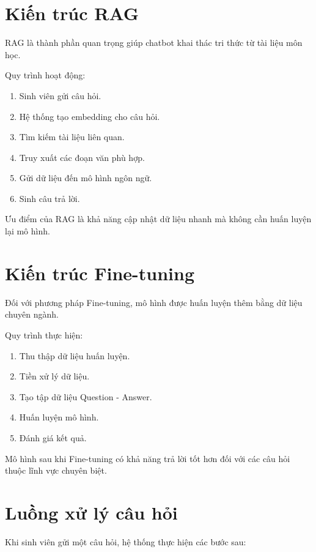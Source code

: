 \documentclass[12pt,a4paper]{report}
\begin{document}
	\section{Kiến trúc RAG}
	
	RAG là thành phần quan trọng giúp chatbot khai thác tri thức từ tài liệu môn học.
	
	Quy trình hoạt động:
	
	\begin{enumerate}
		\item Sinh viên gửi câu hỏi.
		\item Hệ thống tạo embedding cho câu hỏi.
		\item Tìm kiếm tài liệu liên quan.
		\item Truy xuất các đoạn văn phù hợp.
		\item Gửi dữ liệu đến mô hình ngôn ngữ.
		\item Sinh câu trả lời.
	\end{enumerate}
	
	Ưu điểm của RAG là khả năng cập nhật dữ liệu nhanh mà không cần huấn luyện lại mô hình.
	
	\section{Kiến trúc Fine-tuning}
	
	Đối với phương pháp Fine-tuning, mô hình được huấn luyện thêm bằng dữ liệu chuyên ngành.
	
	Quy trình thực hiện:
	
	\begin{enumerate}
		\item Thu thập dữ liệu huấn luyện.
		\item Tiền xử lý dữ liệu.
		\item Tạo tập dữ liệu Question - Answer.
		\item Huấn luyện mô hình.
		\item Đánh giá kết quả.
	\end{enumerate}
	
	Mô hình sau khi Fine-tuning có khả năng trả lời tốt hơn đối với các câu hỏi thuộc lĩnh vực chuyên biệt.
	
	\section{Luồng xử lý câu hỏi}
	
	Khi sinh viên gửi một câu hỏi, hệ thống thực hiện các bước sau:
	
\end{document}
